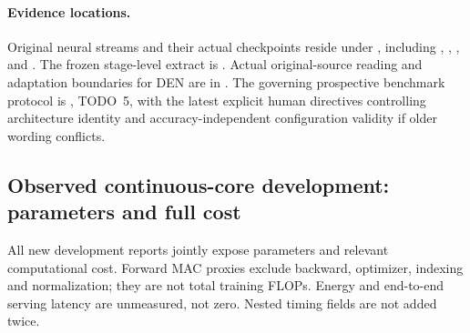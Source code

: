 \paragraph{Evidence locations.}
Original neural streams and their actual checkpoints reside under
,
including ,
,
, and
.
The frozen stage-level extract is
.
Actual original-source reading and adaptation boundaries for DEN are in
.
The governing prospective benchmark protocol is , TODO~5, with
the latest explicit human directives controlling architecture identity and
accuracy-independent configuration validity if older wording conflicts.


\subsection{Observed continuous-core development: parameters and full cost}

All new development reports jointly expose parameters and relevant computational
cost. Forward MAC proxies exclude backward, optimizer, indexing and
normalization; they are not total training FLOPs. Energy and end-to-end serving
latency are unmeasured, not zero. Nested timing fields are not added twice.

